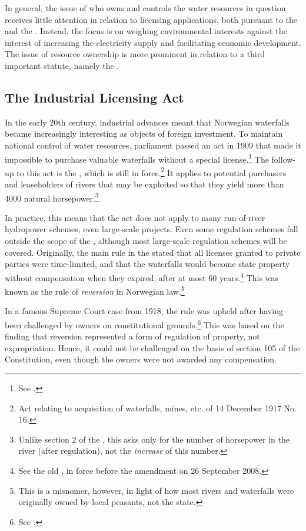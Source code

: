 In general, the issue of who owns and controls the water resources in question receives little attention in relation to licensing applications, both pursuant to the \cite{wra17} and the \cite{wra00}. Instead, the focus is on weighing environmental interests against the interest of increasing the electricity supply and facilitating economic development. The issue of resource ownership is more prominent in relation to a third important statute, namely the \cite{ica17}.

\subsection{The Industrial Licensing Act}\label{sec:ica17}

In the early 20th century, industrial advances meant that Norwegian waterfalls became increasingly interesting as objects of foreign investment. To maintain national control of water resources, parliament passed an act in 1909 that made it impossible to purchase valuable waterfalls without a special license.\footnote{See \cite{....}.} The follow-up to this act is the \cite{ica17}, which is still in force.\footnote{Act relating to acquisition of waterfalls, mines, etc. of 14 December 1917 No. 16.} It applies to potential purchasers and leaseholders of rivers that may be exploited so that they yield more than 4000 natural horsepower.\footnote{Unlike section 2 of the \cite{wra17}, this asks only for the number of horsepower in the river (after regulation), not the {\it increase} of this number.}

In practice, this means that the act does not apply to many run-of-river hydropower schemes, even large-scale projects. Even some regulation schemes fall outside the scope of the \cite{ica17}, although most large-scale regulation schemes will be covered. Originally, the main rule in the \cite{ica17} stated that all licenses granted to private parties were time-limited, and that the waterfalls would become state property without compensation when they expired, after at most 60 years.\footnote{See the old \cite[2]{ica17}, in force before the amendment on 26 September 2008.} This was known as the rule of {\it reversion} in Norwegian law.\footnote{This is a misnomer, however, in light of how most rivers and waterfalls were originally owned by local peasants, not the state.}

In a famous Supreme Court case from 1918, the rule was upheld after having been challenged by owners on constitutional grounds.\footnote{See \cite{johansen18}.} This was based on the finding that reversion represented a form of regulation of property, not expropriation. Hence, it could not be challenged on the basis of section 105 of the Constitution, even though the owners were not awarded any compensation. 

